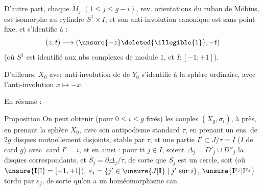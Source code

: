 D'autre part, chaque $\widetilde M_j$ $(1\leq j\leq g-i)$, rev.  orientations du ruban de Möbius, est isomorphe au cylindre $S^1\times I$, et son anti-involution canonique  est sans point fixe, et s'identifie à :
\[
(z,t)\longrightarrow(\unsure{-z}\deleted{\illegible{1}},-t)
\]
(où $S^1$ est identifié aux nbs complexes de module $1$, et $I:[-1;+1]$).

D'ailleurs, $X_0$  avec  anti-involution de  de $Y_0$ s'identifie à la sphère  ordinaire, avec l'anti-involution $x\longmapsto-x$.

En résumé :

\uline{Proposition} On peut obtenir (pour $0\leq i\leq g$ fixés) les couples $(X_g,\sigma_i)$, à  près, en prenant la sphère   $X_0$, avec son antipodisme standard $\tau$, en prenant un ens. de $2g$ disques  mutuellement disjoints, stable par $\tau$, et une partie $I'\subset J/\tau=I$ ($I$ de card $g$) avec $\operatorname{card}I'=i$,  et en  ainsi : pour tt $j\in I$, soient $\Delta_j=D'_j\cup D''_j$ la  disques correspondants, et $S_j=\partial\Delta_j/\tau$, de sorte que $S_j$ est un cercle, soit  (où $\unsure{\mathbf I|\mathbb I}=[-1,+1]$), $\varepsilon_j=\{j'\in\unsure{J|\mathbf I}\mid j'\text{ sur }i\}$, $\unsure{\mathbf I^{\varepsilon_j}|\mathbb I^{\varepsilon_j}}$ tordu par $\varepsilon_j$, de sorte qu'on a un homéomorphisme can.

